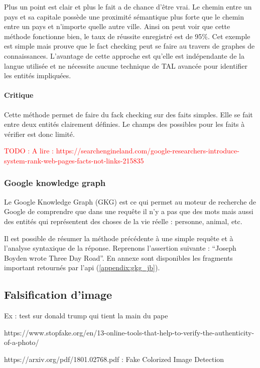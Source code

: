 \documentclass[12pt]{article}
\newcommand\todo[1]{\textcolor{red}{TODO : #1}}
\begin{document}
Plus un point est clair et plus le fait a de chance d'être vrai. Le chemin entre un pays et sa capitale possède une proximité sémantique plus forte que le chemin entre un pays et n'importe quelle autre ville. Ainsi on peut voir que cette méthode fonctionne bien, le taux de réussite enregistré est de 95\%. Cet exemple est simple mais prouve que le fact checking peut se faire au travers de graphes de connaissances. L'avantage de cette approche est qu'elle est indépendante de la langue utilisée et ne nécessite aucune technique de TAL avancée pour identifier les entités impliquées.

\paragraph{Critique} Cette méthode permet de faire du fack checking sur des faits simples. Elle se fait entre deux entités clairement définies. Le champs des possibles pour les faits à vérifier est donc limité.

\todo{A lire : https://searchengineland.com/google-researchers-introduce-system-rank-web-pages-facts-not-links-215835}

\subsubsection{Google knowledge graph}

Le Google Knowledge Graph (GKG) est ce qui permet au moteur de recherche de Google de comprendre que dans une requête il n'y a pas que des mots mais aussi des entités qui représentent des choses de la vie réelle : personne, animal, etc.

Il est possible de résumer la méthode précédente à une simple requête et à l'analyse syntaxique de la réponse. Reprenons l'assertion suivante : \enquote{Joseph Boyden wrote Three Day Road}. En annexe sont disponibles les fragments important retournés par l'api (\ref{appendix:gkg_jb}).


\subsection{Falsification d'image}

Ex : test sur donald trump qui tient la main du pape

https://www.stopfake.org/en/13-online-tools-that-help-to-verify-the-authenticity-of-a-photo/

https://arxiv.org/pdf/1801.02768.pdf : Fake Colorized Image Detection
\end{document}
